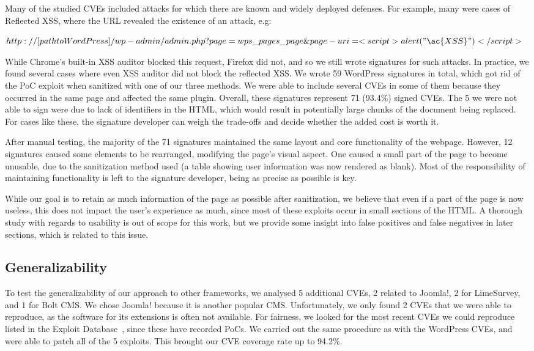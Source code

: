 Many of the studied CVEs included attacks for which there are known and widely deployed defenses. For example, many were cases of Reflected \ac{XSS}, where the URL revealed the existence of an attack, e.g:


$http://[path to WordPress]/wp-admin/admin.php?page=wps\_pages\_page\&page-uri=<script>alert("\ac{XSS}")</script>$

While Chrome's built-in \ac{XSS} auditor blocked this request, Firefox did not, and so we still wrote signatures for such attacks. In practice, we found several cases where even XSS auditor did not block the reflected XSS. We wrote 59 WordPress signatures in total, which got rid of the PoC exploit when sanitized with one of our three methods. We were able to include several CVEs in some of them because they occurred in the same page and affected the same plugin. Overall, these signatures represent 71 (93.4\%) signed CVEs. The 5 we were not able to sign were due to lack of identifiers in the HTML, which would result in potentially large chunks of the document being replaced. For cases like these, the signature developer can weigh the trade-offs and decide whether the added cost is worth it.

After manual testing, the majority of the 71 signatures maintained the same layout and core functionality of the webpage. However, 12 signatures caused some elements to be rearranged, modifying the page's visual aspect. One caused a small part of the page to become unusable, due to the sanitization method used (a table showing user information was now rendered as blank). Most of the responsibility of maintaining functionality is left to the signature developer, being as precise as possible is key.

While our goal is to retain as much information of the page as possible after sanitization, we believe that even if a part of the page is now useless, this does not impact the user's experience as much, since most of these exploits occur in small sections of the HTML. A thorough study with regards to usability is out of scope for this work, but we provide some insight into false positives and false negatives in later sections, which is related to this issue.

\subsection{Generalizability} \label{generalizability}

To test the generalizability of our approach to other frameworks, we
analysed 5 additional CVEs, 2 related to Joomla!, 2 for LimeSurvey,
and 1 for Bolt CMS.  We chose Joomla! because it is another
popular \ac{CMS}. Unfortunately, we only found 2 CVEs
that we were able to reproduce, as the software for its extensions is
often not available. For fairness, we looked for the most recent CVEs
we could reproduce listed in the Exploit Database~\cite{exploitdb}, since
these have recorded \acp{PoC}. We carried out the same
procedure as with the WordPress CVEs, and were able to patch all of
the 5 exploits. This brought our CVE coverage rate up to 94.2\%.


